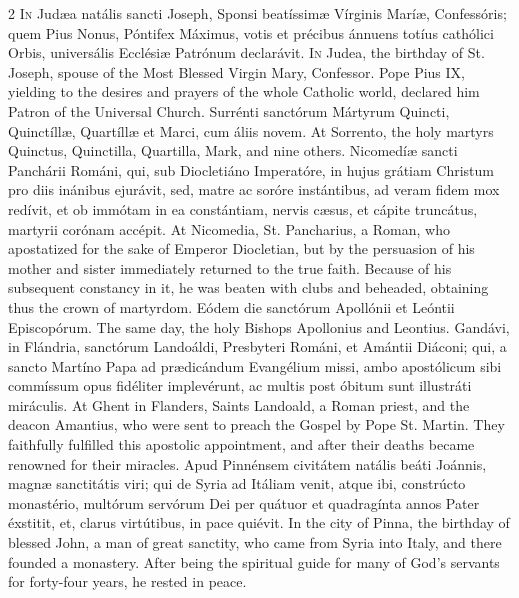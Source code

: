 \begin{paracol}{2}
\lettrine[lines=2]{I}{n} Judæa natális sancti Joseph, Sponsi 
 beatíssimæ Vírginis Maríæ, Confessóris; quem Pius Nonus, Póntifex Máximus, 
 votis et précibus ánnuens totíus cathólici Orbis, universális Ecclésiæ 
 Patrónum declarávit.
\switchcolumn
{}
\lettrine[lines=2]{I}{n} Judea, the birthday of St. Joseph, spouse of the Most Blessed Virgin 
 Mary, Confessor. Pope Pius IX, yielding to the desires and prayers of the whole 
 Catholic world, declared him Patron of the Universal Church.
\switchcolumn*
{}
Surrénti sanctórum Mártyrum Quincti, Quinctíllæ, 
 Quartíllæ et Marci, cum áliis novem.
\switchcolumn
{}
At Sorrento, the holy martyrs Quinctus, Quinctilla, Quartilla, Mark, and 
 nine others.
\switchcolumn*
{}
Nicomedíæ sancti Panchárii Románi, qui, sub 
 Diocletiáno Imperatóre, in hujus grátiam Christum pro diis inánibus ejurávit, 
 sed, matre ac soróre instántibus, ad veram fidem mox redívit, et ob immótam 
 in ea constántiam, nervis cæsus, et cápite truncátus, martyrii corónam 
 accépit.
\switchcolumn
{}
At Nicomedia, St. Pancharius, a Roman, who apostatized for the sake of 
 Emperor Diocletian, but by the persuasion of his mother and sister 
 immediately returned to the true faith. Because of his subsequent 
 constancy in it, he was beaten with clubs and beheaded, obtaining thus the 
 crown of martyrdom.
\switchcolumn*
{}
Eódem die sanctórum Apollónii et Leóntii Episcopórum.
\switchcolumn
{}
The same day, the holy Bishops Apollonius and Leontius.
\switchcolumn*
{}
Gandávi, in Flándria, sanctórum Landoáldi, Presbyteri Románi, et Amántii 
 Diáconi; qui, a sancto Martíno Papa ad prædicándum 
 Evangélium missi, ambo apostólicum sibi commíssum opus fidéliter implevérunt, 
 ac multis post óbitum sunt illustráti miráculis.
\switchcolumn
{}
At Ghent in Flanders, Saints Landoald, a Roman priest, and the deacon 
 Amantius, who were sent to preach the Gospel by Pope St. Martin. They 
 faithfully fulfilled this apostolic appointment, and after their deaths 
 became renowned for their miracles.
\switchcolumn*
{}
Apud Pinnénsem civitátem natális beáti Joánnis, magnæ 
 sanctitátis viri; qui de Syria ad Itáliam venit, atque ibi, constrúcto 
 monastério, multórum servórum Dei per quátuor et quadragínta annos Pater éxstitit, et, clarus virtútibus, in pace quiévit.
\switchcolumn
{}
In the city of Pinna, the birthday of blessed John, a man of great sanctity, 
 who came from Syria into Italy, and there founded a monastery. After 
 being the spiritual guide for many of God's servants for forty-four years, 
 he rested in peace.
\switchcolumn*
{}
\end{paracol}


